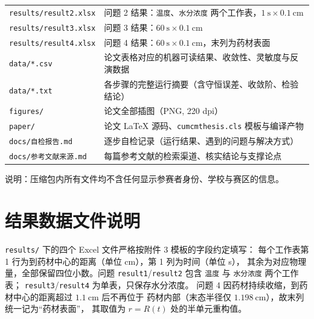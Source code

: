 \begin{center}
\begin{longtable}{@{}p{4.5cm}p{9.8cm}@{}}
\texttt{results/result2.xlsx} & 问题 2 结果：\texttt{温度}、\texttt{水分浓度} 两个工作表，$1\ \mathrm{s}\times0.1\ \mathrm{cm}$ \\
\texttt{results/result3.xlsx} & 问题 3 结果：$60\ \mathrm{s}\times0.1\ \mathrm{cm}$ \\
\texttt{results/result4.xlsx} & 问题 4 结果：$60\ \mathrm{s}\times0.1\ \mathrm{cm}$，末列为药材表面 \\
\texttt{data/*.csv} & 论文表格对应的机器可读结果、收敛性、灵敏度与反演数据 \\
\texttt{data/*.txt} & 各步骤的完整运行摘要（含守恒误差、收敛阶、检验结论） \\
\texttt{figures/} & 论文全部插图（PNG, 220 dpi） \\
\texttt{paper/} & 论文 LaTeX 源码、\texttt{cumcmthesis.cls} 模板与编译产物 \\
\texttt{docs/自检报告.md} & 逐步自检记录（运行结果、遇到的问题与解决方式） \\
\texttt{docs/参考文献来源.md} & 每篇参考文献的检索渠道、核实结论与支撑论点 \\
\bottomrule
\end{longtable}
\end{center}

\noindent 说明：压缩包内所有文件均不含任何显示参赛者身份、学校与赛区的信息。



\section{结果数据文件说明}

\texttt{results/} 下的四个 Excel 文件严格按附件 3 模板的字段约定填写：
每个工作表第 1 行为到药材中心的距离（单位 cm），第 1 列为时间（单位 s），
其余为对应物理量，全部保留四位小数。问题 \texttt{result1}/\texttt{result2}
包含 \texttt{温度} 与 \texttt{水分浓度} 两个工作表；
\texttt{result3}/\texttt{result4} 为单表，只保存水分浓度。
问题 4 因药材持续收缩，到药材中心的距离超过 $1.1\ \mathrm{cm}$ 后不再位于
药材内部（末态半径仅 $1.198\ \mathrm{cm}$），故末列统一记为“药材表面”，
其取值为 $r=R(t)$ 处的半单元重构值。
